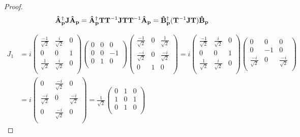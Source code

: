\documentclass[letterpaper]{article}
\theoremstyle{definition}
\begin{document}
\begin{proof}
  \[\vb{\hat{A}}^\dagger_{\vb{p}}\vb{J}\vb{\hat{A}}_{\vb{p}}=\vb{\hat{A}}^\dagger_{\vb{p}}\vb{T}\vb{T}^{-1}\vb{J}\vb{T}\vb{T}^{-1}\vb{\hat{A}}_{\vb{p}}=\vb{\hat{B}}^\dagger_{\vb{p}}(\vb{T}^{-1}\vb{J}\vb{T})\vb{\hat{B}}_{\vb{p}}\]

  \begin{align*}
    J_1 & =i\begin{pmatrix}
      \frac{-1}{\sqrt{2}} & \frac{i}{\sqrt{2}} & 0 \\
      0                   & 0                  & 1 \\
      \frac{1}{\sqrt{2}}  & \frac{i}{\sqrt{2}} & 0 \\
    \end{pmatrix}\begin{pmatrix}
      0 & 0 & 0  \\
      0 & 0 & -1 \\
      0 & 1 & 0  \\
    \end{pmatrix}\begin{pmatrix}
      \frac{-1}{\sqrt{2}} & 0 & \frac{1}{\sqrt{2}}  \\
      \frac{-i}{\sqrt{2}} & 0 & \frac{-i}{\sqrt{2}} \\
      0                   & 1 & 0                   \\
    \end{pmatrix}=i\begin{pmatrix}
      \frac{-1}{\sqrt{2}} & \frac{i}{\sqrt{2}} & 0 \\
      0                   & 0                  & 1 \\
      \frac{1}{\sqrt{2}}  & \frac{i}{\sqrt{2}} & 0 \\
    \end{pmatrix}\begin{pmatrix}
      0                   & 0  & 0                   \\
      0                   & -1 & 0                   \\
      \frac{-i}{\sqrt{2}} & 0  & \frac{-i}{\sqrt{2}} \\
    \end{pmatrix} \\
        & =i\begin{pmatrix}
      0                   & \frac{-i}{\sqrt{2}} & 0                   \\
      \frac{-i}{\sqrt{2}} & 0                   & \frac{-i}{\sqrt{2}} \\
      0                   & \frac{-i}{\sqrt{2}} & 0                   \\
    \end{pmatrix}=\frac{1}{\sqrt{2}}\begin{pmatrix}
      0 & 1 & 0 \\
      1 & 0 & 1 \\
      0 & 1 & 0 \\
    \end{pmatrix}
  \end{align*}


\end{proof}
\end{document}
